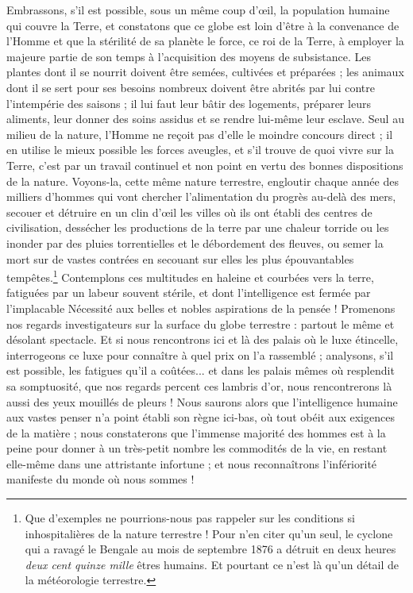 \documentclass[a4paper, 11pt, oneside, landscape]{article}
\begin{document}
Embrassons, s'il est possible, sous un même coup d'œil, la population humaine qui couvre la Terre, et constatons que ce globe est loin d'être à la convenance de l'Homme et que la stérilité de sa planète le force, ce roi de la Terre, à employer la majeure partie de son temps à l'acquisition des moyens de subsistance. Les plantes dont il se nourrit doivent être semées, cultivées et préparées ; les animaux dont il se sert pour ses besoins nombreux doivent être abrités par lui contre l'intempérie des saisons ; il lui faut leur bâtir des logements, préparer leurs aliments, leur donner des soins assidus et se rendre lui-même leur esclave. Seul au milieu de la nature, l'Homme ne reçoit pas d'elle le moindre concours direct ; il en utilise le mieux possible les forces aveugles, et s'il trouve de quoi vivre sur la Terre, c'est par un travail continuel et non point en vertu des bonnes dispositions de la nature. Voyons-la, cette même nature terrestre, engloutir chaque année des milliers d'hommes qui vont chercher l'alimentation du progrès au-delà des mers, secouer et détruire en un clin d'œil les villes où ils ont établi des centres de civilisation, dessécher les productions de la terre par une chaleur torride ou les inonder par des pluies torrentielles et le débordement des fleuves, ou semer la mort sur de vastes contrées en secouant sur elles les plus épouvantables tempêtes.\footnote{Que d'exemples ne pourrions-nous pas rappeler sur les conditions si inhospitalières de la nature terrestre ! Pour n'en citer qu'un seul, le cyclone qui a ravagé le Bengale au mois de septembre 1876 a détruit en deux heures \emph{deux cent quinze mille} êtres humains. Et pourtant ce n'est là qu'un détail de la météorologie terrestre.} Contemplons ces multitudes en haleine et courbées vers la terre, fatiguées par un labeur souvent stérile, et dont l'intelligence est fermée par l'implacable Nécessité aux belles et nobles aspirations de la pensée ! Promenons nos regards investigateurs sur la surface du globe terrestre : partout le même et désolant spectacle. Et si nous rencontrons ici et là des palais où le luxe étincelle, interrogeons ce luxe pour connaître à quel prix on l'a rassemblé ; analysons, s'il est possible, les fatigues qu'il a coûtées... et dans les palais mêmes où resplendit sa somptuosité, que nos regards percent ces lambris d'or, nous rencontrerons là aussi des yeux mouillés de pleurs ! Nous saurons alors que l'intelligence humaine aux vastes penser n'a point établi son règne ici-bas, où tout obéit aux exigences de la matière ; nous constaterons que l'immense majorité des hommes est à la peine pour donner à un très-petit nombre les commodités de la vie, en restant elle-même dans une attristante infortune ; et nous reconnaîtrons l'infériorité manifeste du monde où nous sommes !
\end{document}
